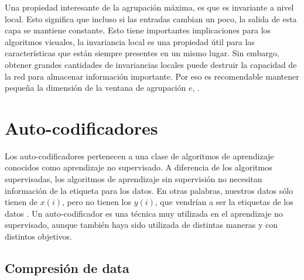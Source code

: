 	Una propiedad interesante de la agrupación máxima, es que es invariante a nivel local. Esto significa que incluso si las entradas cambian un poco, la salida de esta capa se mantiene constante. Esto tiene importantes implicaciones para los algoritmos visuales, la invariancia local es una propiedad útil para las características que están siempre presentes en un mismo lugar. Sin embargo, obtener grandes cantidades de invariancias locales puede destruir la capacidad de la red para almacenar información importante. Por eso es recomendable mantener pequeña la dimensión de la ventana de agrupación $e$, \cite{dlBook}.
	

\section{Auto-codificadores}

    Los auto-codificadores pertenecen a una clase de algoritmos de aprendizaje conocidos como aprendizaje no supervisado. A diferencia de los algoritmos supervisadas, los algoritmos de aprendizaje sin supervisión no necesitan información de la etiqueta para los datos. En otras palabras, nuestros datos sólo tienen de $x(i)$, pero no tienen los $y(i)$, que vendrían a ser la etiquetas de los datos \cite{Le15atutorial, website:UFLDL}. Un auto-codificador es una técnica muy utilizada en el aprendizaje no supervisado, aunque también haya sido utilizada de distintas maneras y con distintos objetivos.

    \subsection{Compresión de data}

